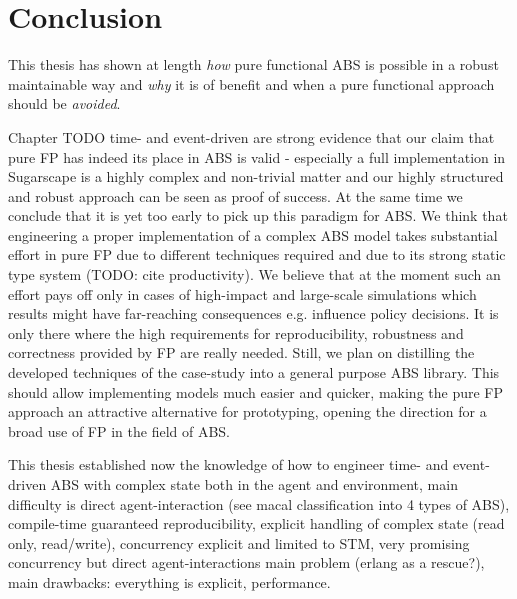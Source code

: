 \chapter{Conclusion}
\label{ch:conclusion}
This thesis has shown at length \textit{how} pure functional ABS is possible in a robust maintainable way and \textit{why} it is of benefit and when a pure functional approach should be \textit{avoided}.

Chapter TODO time- and event-driven are strong evidence that our claim that pure FP has indeed its place in ABS is valid - especially a full implementation in Sugarscape is a highly complex and non-trivial matter and our highly structured and robust approach can be seen as proof of success. At the same time we conclude that it is yet too early to pick up this paradigm for ABS. We think that engineering a proper implementation of a complex ABS model takes substantial effort in pure FP due to different techniques required and due to its strong static type system (TODO: cite productivity). We believe that at the moment such an effort pays off only in cases of high-impact and large-scale simulations which results might have far-reaching consequences e.g. influence policy decisions. It is only there where the high requirements for reproducibility, robustness and correctness provided by FP are really needed. Still, we plan on distilling the developed techniques of the case-study into a general purpose ABS library. This should allow implementing models much easier and quicker, making the pure FP approach an attractive alternative for prototyping, opening the direction for a broad use of FP in the field of ABS.

This thesis established now the knowledge of how to engineer time- and event-driven ABS with complex state both in the agent and environment, main difficulty is direct agent-interaction (see macal classification into 4 types of ABS), compile-time guaranteed reproducibility, explicit handling of complex state (read only, read/write), concurrency explicit and limited to STM, very promising concurrency but direct agent-interactions main problem (erlang as a rescue?), main drawbacks: everything is explicit, performance.

